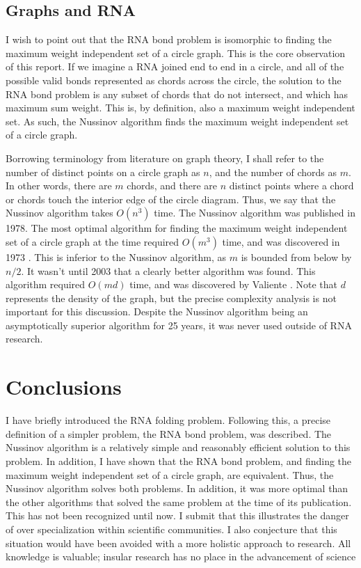 \documentclass[12pt, a4paper]{article}
\begin{document}
\subsection{Graphs and RNA}
I wish to point out that the RNA bond problem is isomorphic to finding the maximum weight independent set of a circle graph. This is the core observation of this report. If we imagine a RNA joined end to end in a circle, and all of the possible valid bonds represented as chords across the circle, the solution to the RNA bond problem is any subset of chords that do not intersect, and which has maximum sum weight. This is, by definition, also a maximum weight independent set. As such, the Nussinov algorithm finds the maximum weight independent set of a circle graph.

Borrowing terminology from literature on graph theory, I shall refer to the number of distinct points on a circle graph as $n$, and the number of chords as $m$. In other words, there are $m$ chords, and there are $n$ distinct points where a chord or chords touch the interior edge of the circle diagram. Thus, we say that the Nussinov algorithm takes $O(n^3)$ time. The Nussinov algorithm was published in 1978. The most optimal algorithm for finding the maximum weight independent set of a circle graph at the time required $O(m^3)$ time, and was discovered in 1973 \cite{gavril1973algorithms}. This is inferior to the Nussinov algorithm, as $m$ is bounded from below by $n / 2$. It wasn't until 2003 that a clearly better algorithm was found. This algorithm required $O(md)$ time, and was discovered by Valiente \cite{valiente2003new}. Note that $d$ represents the density of the graph, but the precise complexity analysis is not important for this discussion. Despite the Nussinov algorithm being an asymptotically superior algorithm for 25 years, it was never used outside of RNA research.


\section{Conclusions}
I have briefly introduced the RNA folding problem. Following this, a precise definition of a simpler problem, the RNA bond problem, was described. The Nussinov algorithm is a relatively simple and reasonably efficient solution to this problem. In addition, I have shown that the RNA bond problem, and finding the maximum weight independent set of a circle graph, are equivalent. Thus, the Nussinov algorithm solves both problems. In addition, it was more optimal than the other algorithms that solved the same problem at the time of its publication. This has not been recognized until now. I submit that this illustrates the danger of over specialization within scientific communities. I also conjecture that this situation would have been avoided with a more holistic approach to research. All
knowledge is valuable; insular research has no place in the advancement of science




\end{document}
